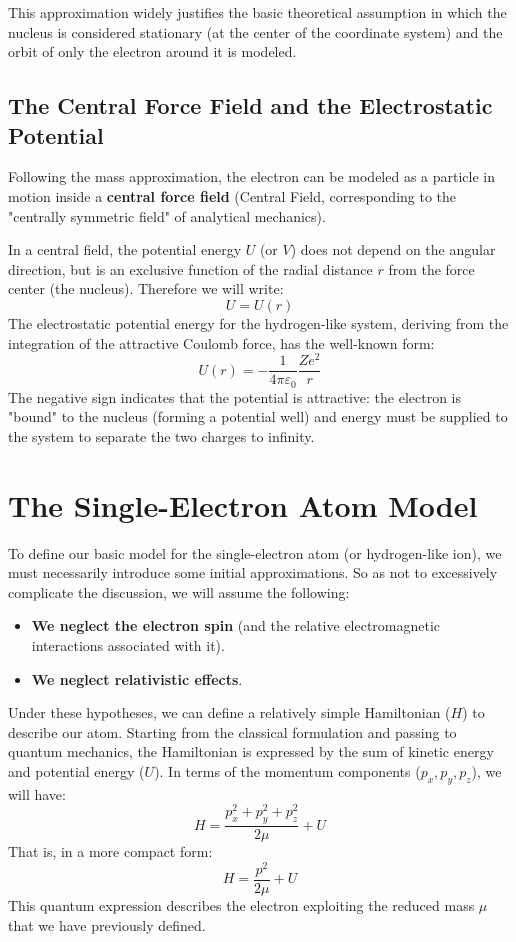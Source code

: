 This approximation widely justifies the basic theoretical assumption in which the nucleus is considered stationary (at the center of the coordinate system) and the orbit of only the electron around it is modeled.

\subsection{The Central Force Field and the Electrostatic Potential}

Following the mass approximation, the electron can be modeled as a particle in motion inside a \textbf{central force field} (Central Field, corresponding to the "centrally symmetric field" of analytical mechanics).

In a central field, the potential energy $U$ (or $V$) does not depend on the angular direction, but is an exclusive function of the radial distance $r$ from the force center (the nucleus). Therefore we will write:
\begin{equation}
U = U(r)
\end{equation}
The electrostatic potential energy for the hydrogen-like system, deriving from the integration of the attractive Coulomb force, has the well-known form:
\begin{equation}
U(r) = - \frac{1}{4\pi\varepsilon_0} \frac{Ze^2}{r}
\end{equation}
The negative sign indicates that the potential is attractive: the electron is "bound" to the nucleus (forming a potential well) and energy must be supplied to the system to separate the two charges to infinity.

\section{The Single-Electron Atom Model}

To define our basic model for the single-electron atom (or hydrogen-like ion), we must necessarily introduce some initial approximations. So as not to excessively complicate the discussion, we will assume the following:
\begin{itemize}
\item \textbf{We neglect the electron spin} (and the relative electromagnetic interactions associated with it).
\item \textbf{We neglect relativistic effects}.
\end{itemize}

Under these hypotheses, we can define a relatively simple Hamiltonian ($H$) to describe our atom. Starting from the classical formulation and passing to quantum mechanics, the Hamiltonian is expressed by the sum of kinetic energy and potential energy ($U$). In terms of the momentum components ($p_x, p_y, p_z$), we will have:
\begin{equation}
H = \frac{p_x^2 + p_y^2 + p_z^2}{2\mu} + U
\end{equation}
That is, in a more compact form:
\begin{equation}
H = \frac{p^2}{2\mu} + U
\end{equation}
This quantum expression describes the electron exploiting the reduced mass $\mu$ that we have previously defined.

